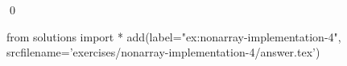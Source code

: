 
\begin{ex} 
  \label{ex:nonarray-implementation-4}
  
  \qed
\end{ex} 
\begin{python0}
from solutions import *
add(label="ex:nonarray-implementation-4",
    srcfilename='exercises/nonarray-implementation-4/answer.tex') 
\end{python0}
